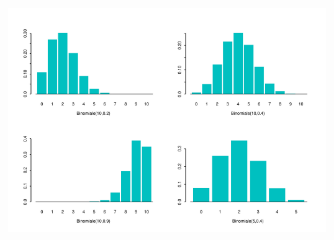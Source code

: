 \documentclass[smaller]{beamer}\usepackage[]{graphicx}\usepackage[]{color}
\newtheorem{remark}{Remark}[section]
\begin{document}
%
%

\begin{frame}{\secname}
  \begin{figure}[ptb]\centering
  \includegraphics[width=0.75\textwidth,height=0.6\textheight]{img/distbin.pdf}
  \end{figure}
\end{frame}
\end{document}
